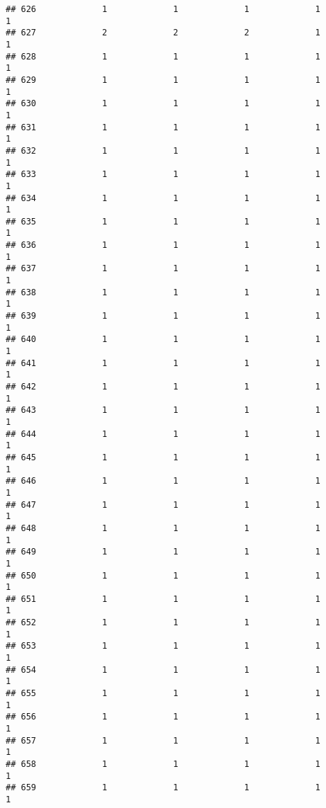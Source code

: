 \documentclass[
]{article}
\begin{document}
\begin{verbatim}
## 626             1             1             1             1             1
## 627             2             2             2             1             1
## 628             1             1             1             1             1
## 629             1             1             1             1             1
## 630             1             1             1             1             1
## 631             1             1             1             1             1
## 632             1             1             1             1             1
## 633             1             1             1             1             1
## 634             1             1             1             1             1
## 635             1             1             1             1             1
## 636             1             1             1             1             1
## 637             1             1             1             1             1
## 638             1             1             1             1             1
## 639             1             1             1             1             1
## 640             1             1             1             1             1
## 641             1             1             1             1             1
## 642             1             1             1             1             1
## 643             1             1             1             1             1
## 644             1             1             1             1             1
## 645             1             1             1             1             1
## 646             1             1             1             1             1
## 647             1             1             1             1             1
## 648             1             1             1             1             1
## 649             1             1             1             1             1
## 650             1             1             1             1             1
## 651             1             1             1             1             1
## 652             1             1             1             1             1
## 653             1             1             1             1             1
## 654             1             1             1             1             1
## 655             1             1             1             1             1
## 656             1             1             1             1             1
## 657             1             1             1             1             1
## 658             1             1             1             1             1
## 659             1             1             1             1             1

\end{verbatim}
\end{document}
